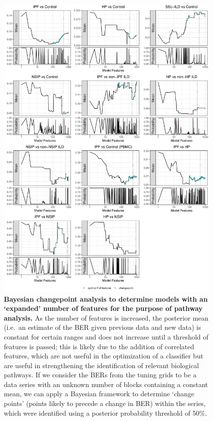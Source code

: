 \documentclass[
]{article}
\begin{document}
\begin{figure}

{\centering \includegraphics[width=0.8\linewidth,]{./Figures/SysReview/FigE7_bayes} 

}

\caption[Bayesian changepoint]{\textbf{Bayesian changepoint analysis to determine models with an ‘expanded’ number of features for the purpose of pathway analysis.} As the number of features is increased, the posterior mean (i.e.~an estimate of the BER given previous data and new data) is constant for certain ranges and does not increase until a threshold of features is passed; this is likely due to the addition of correlated features, which are not useful in the optimization of a classifier but are useful in strengthening the identification of relevant biological pathways. If we consider the BERs from the tuning grids to be a data series with an unknown number of blocks containing a constant mean, we can apply a Bayesian framework to determine `change points' (points likely to precede a change in BER) within the series, which were identified using a posterior probability threshold of 50\%.}\label{fig:bayes}
\end{figure}
\end{document}
